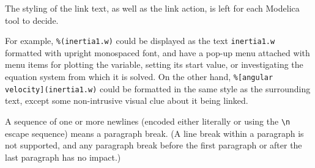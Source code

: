 The styling of the link text, as well as the link action, is left for each Modelica
tool to decide.

\begin{nonnormative}
For example, \lstinline!%(inertia1.w)! could be displayed as the text
\lstinline!inertia1.w! formatted with upright monospaced font, and have a pop-up
menu attached with menu items for plotting the variable, setting its start
value, or investigating the equation system from which it is solved.  On the
other hand, \lstinline!%[angular velocity](inertia1.w)! could be formatted in
the same style as the surrounding text, except some non-intrusive visual clue
about it being linked.
\end{nonnormative}

A sequence of one or more newlines (encoded either literally or using the \lstinline!\n!
escape sequence) means a paragraph break.  (A line break within a paragraph is
not supported, and any paragraph break before the first paragraph or after the last
paragraph has no impact.)

